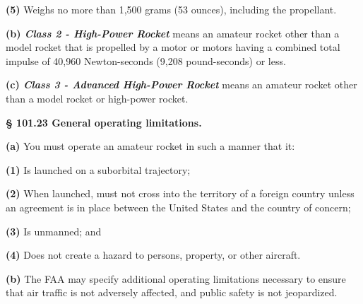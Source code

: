 \begin{adjustwidth}{0.5in}{0.0in}
\textbf{(5)} Weighs no more than 1,500 grams (53 ounces), including the propellant.\par

\end{adjustwidth}

\textbf{(b)\textit{ Class 2 - High-Power Rocket}} means an amateur rocket other than a model rocket that is propelled by a motor or motors having a combined total impulse of 40,960 Newton-seconds (9,208 pound-seconds) or less.\par

\textbf{(c)\textit{ Class 3 - Advanced High-Power Rocket}} means an amateur rocket other than a model rocket or high-power rocket.\par

\textbf{§ 101.23 General operating limitations.}\par

\textbf{(a)} You must operate an amateur rocket in such a manner that it:\par

\begin{adjustwidth}{0.5in}{0.0in}
\textbf{(1)} Is launched on a suborbital trajectory;\par

\end{adjustwidth}

\begin{adjustwidth}{0.5in}{0.0in}
\textbf{(2)} When launched, must not cross into the territory of a foreign country unless an agreement is in place between the United States and the country of concern;\par

\end{adjustwidth}

\begin{adjustwidth}{0.5in}{0.0in}
\textbf{(3)} Is unmanned; and\par

\end{adjustwidth}

\begin{adjustwidth}{0.5in}{0.0in}
\textbf{(4)} Does not create a hazard to persons, property, or other aircraft.\par

\end{adjustwidth}

\textbf{(b)} The FAA may specify additional operating limitations necessary to ensure that air traffic is not adversely affected, and public safety is not jeopardized.\par

